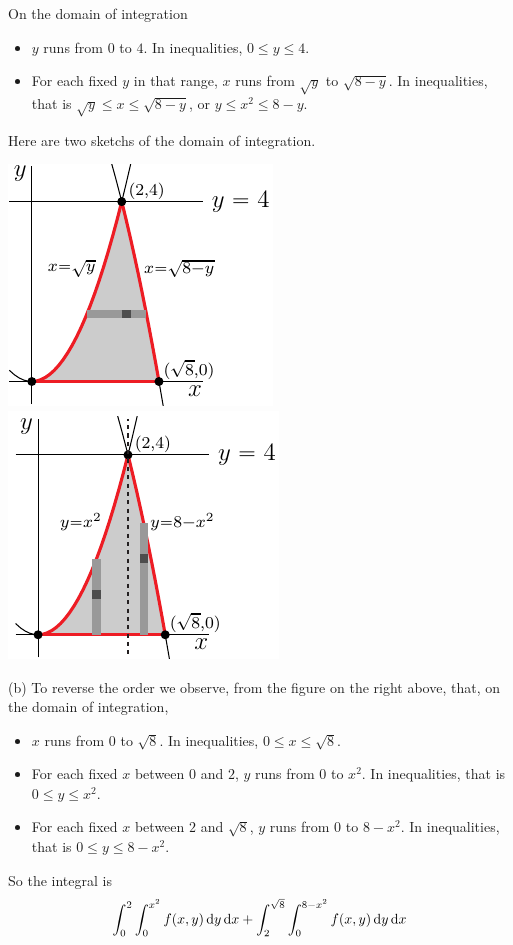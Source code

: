 \begin{solution}
On the domain of integration 
\begin{itemize}
\item
$y$ runs from $0$ to $4$. In inequalities, $0\le y\le 4$.
\item
For each fixed $y$ in that range, $x$ runs from $\sqrt{y}$ to
$\sqrt{8-y}$. In inequalities, that is $\sqrt{y}\le x\le \sqrt{8-y}$,
or $y\le x^2\le 8-y$.
\end{itemize}
Here are two sketchs of the domain of integration.

\begin{center}
     \includegraphics{fig/OE12D_7a.pdf}\qquad\qquad
     \includegraphics{fig/OE12D_7b.pdf}
\end{center}


(b) To reverse the order we observe, from the figure on the right above,
that, on the domain of integration,
\begin{itemize}
\item
$x$ runs from $0$ to $\sqrt{8}$. In inequalities, $0\le x\le \sqrt{8}$.
\item
For each fixed $x$ between $0$ and $2$, $y$ runs from $0$ to
$x^2$. In inequalities, that is $0\le y\le x^2$.
\item
For each fixed $x$ between $2$ and $\sqrt{8}$, $y$ runs from $0$ to
$8-x^2$. In inequalities, that is $0\le y\le 8-x^2$.
\end{itemize}
So the integral is
\begin{equation*}
\int_0^2\int_0^{x^2} f(x,y)\,\mathrm{d}y\,\mathrm{d}x
+\int_2^{\sqrt{8}}\int_0^{8-x^2} f(x,y)\,\mathrm{d}y\,\mathrm{d}x
\end{equation*}


\end{solution}
